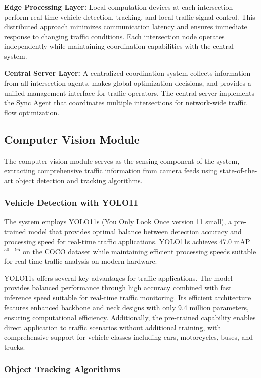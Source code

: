 \textbf{Edge Processing Layer:} Local computation devices at each intersection perform real-time vehicle 
detection, tracking, and local traffic signal control. This distributed approach minimizes communication 
latency and ensures immediate response to changing traffic conditions. Each intersection node operates 
independently while maintaining coordination capabilities with the central system.

\textbf{Central Server Layer:} A centralized coordination system collects information from all intersection 
agents, makes global optimization decisions, and provides a unified management interface for traffic 
operators. The central server implements the Sync Agent that coordinates multiple intersections for 
network-wide traffic flow optimization.

\subsection{Computer Vision Module}\label{subsec2a-2}

The computer vision module serves as the sensing component of the system, extracting comprehensive 
traffic information from camera feeds using state-of-the-art object detection and tracking algorithms.

\subsubsection{Vehicle Detection with YOLO11}

The system employs YOLO11s (You Only Look Once version 11 small), a pre-trained model that provides 
optimal balance between detection accuracy and processing speed for real-time traffic applications. YOLO11s 
achieves 47.0 mAP$^{50-95}$ on the COCO dataset while maintaining efficient processing speeds suitable for 
real-time traffic analysis on modern hardware.

YOLO11s offers several key advantages for traffic applications. The model provides balanced performance 
through high accuracy combined with fast inference speed suitable for real-time traffic monitoring. Its 
efficient architecture features enhanced backbone and neck designs with only 9.4 million parameters, 
ensuring computational efficiency. Additionally, the pre-trained capability enables direct application 
to traffic scenarios without additional training, with comprehensive support for vehicle classes including 
cars, motorcycles, buses, and trucks.

\subsubsection{Object Tracking Algorithms}

